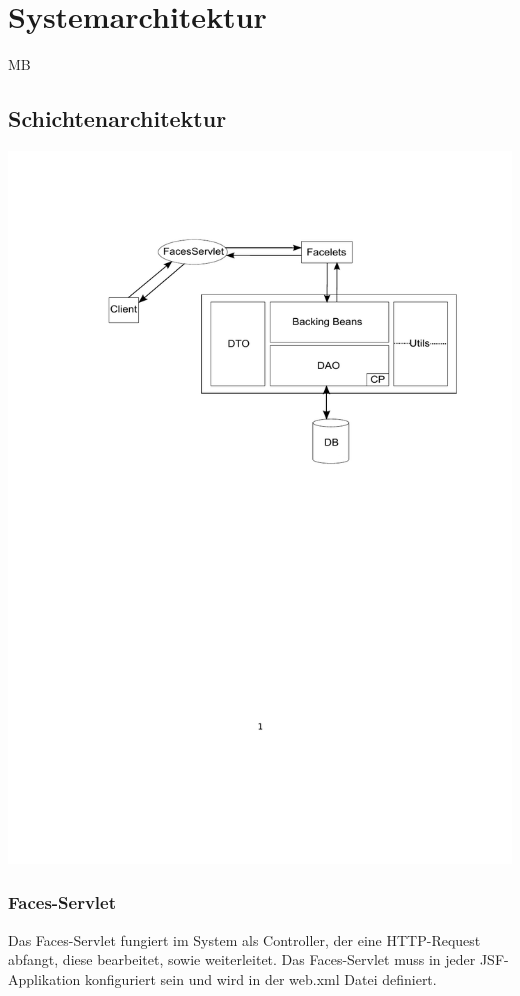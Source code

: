 \chapter{Systemarchitektur}
\begin{tiny}
MB \\
\end{tiny}
\section{Schichtenarchitektur}
    \includegraphics[scale=0.80]{Grafiken/Schichtenarchitektur.pdf}
	\subsection{Faces-Servlet}
	    Das Faces-Servlet fungiert im System als Controller, der eine HTTP-Request abfangt, diese bearbeitet, sowie weiterleitet. Das Faces-Servlet muss in jeder JSF-Applikation konfiguriert sein und wird in der web.xml Datei definiert. 
